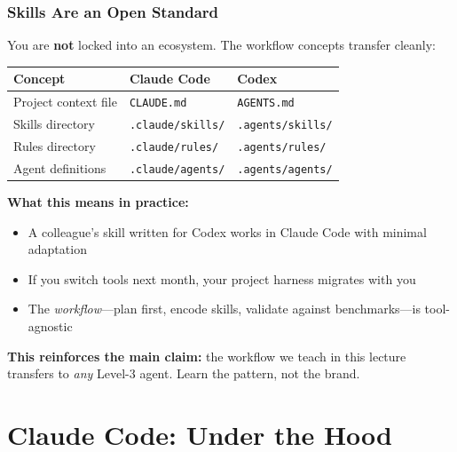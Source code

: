 \documentclass[10pt,english,aspectratio=169]{beamer}
\begin{document}
\begin{frame}
\frametitle{Skills Are an Open Standard}

You are \textbf{not} locked into an ecosystem. The workflow concepts transfer cleanly:

\vspace{0.3cm}

\begin{center}
\small
\begin{tabular}{|l|l|l|}
\hline
\textbf{Concept} & \textbf{Claude Code} & \textbf{Codex} \\ \hline
Project context file & \texttt{CLAUDE.md} & \texttt{AGENTS.md} \\ \hline
Skills directory & \texttt{.claude/skills/} & \texttt{.agents/skills/} \\ \hline
Rules directory & \texttt{.claude/rules/} & \texttt{.agents/rules/} \\ \hline
Agent definitions & \texttt{.claude/agents/} & \texttt{.agents/agents/} \\ \hline
\end{tabular}
\end{center}

\vspace{0.3cm}

\textbf{What this means in practice:}
\begin{itemize}
    \item A colleague's skill written for Codex works in Claude Code with minimal adaptation
    \item If you switch tools next month, your project harness migrates with you
    \item The \textit{workflow}---plan first, encode skills, validate against benchmarks---is tool-agnostic
\end{itemize}

\vspace{0.2cm}

\textbf{This reinforces the main claim:} the workflow we teach in this lecture transfers to \textit{any} Level-3 agent. Learn the pattern, not the brand.
\end{frame}

\section{Claude Code: Under the Hood}
\end{document}
